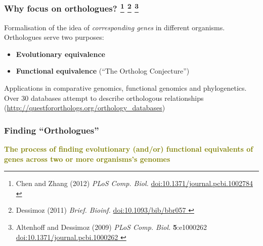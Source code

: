 
% 
\begin{frame}
  \frametitle{Why focus on orthologues?
    \footnote{\tiny{Chen and Zhang (2012) \textit{PLoS Comp. Biol.} \href{http://dx.doi.org/10.1371/journal.pcbi.1002784}{doi:10.1371/journal.pcbi.1002784
    }}}  
    \footnote{\tiny{Dessimoz (2011) \textit{Brief. Bioinf.} \href{http://dx.doi.org/10.1093/bib/bbr057}{doi:10.1093/bib/bbr057
    }}}
    \footnote{\tiny{Altenhoff and Dessimoz (2009) \textit{PLoS Comp. Biol.} \textbf{5}:e1000262 \href{http://dx.doi.org/10.1371/journal.pcbi.1000262}{doi:10.1371/journal.pcbi.1000262
    }}}
  }
  Formalisation of the idea of \textit{corresponding genes} in different organisms. \\
  \textcolor{hutton_blue}{Orthologues serve two purposes:}
  \begin{itemize}
    \item \textcolor{hutton_green}{\textbf{Evolutionary equivalence}}
    \item \textcolor{hutton_purple}{\textbf{Functional equivalence}} (``The Ortholog Conjecture'')
  \end{itemize}
  Applications in comparative genomics, functional genomics and phylogenetics. \\
  \textcolor{RawSienna}{Over 30 databases attempt to describe orthologous relationships} (\href{http://questfororthologs.org/orthology_databases
}{http://questfororthologs.org/orthology\_databases})
\end{frame}

%
\begin{frame}
  \frametitle{Finding ``Orthologues''}
  \Large{
    \textcolor{olive}{
      \textbf{
      The process of finding evolutionary (and/or) functional equivalents of genes across two or more organisms's genomes
      }
    }
  }
\end{frame}

